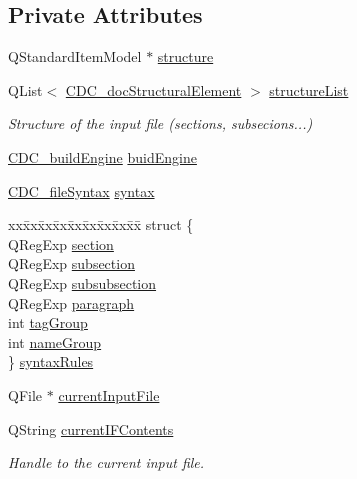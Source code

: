 \subsection*{Private Attributes}
\begin{DoxyCompactItemize}
\item 
Q\+Standard\+Item\+Model $\ast$ \hyperlink{classinput_file_parser_ac875012f371d91ecfc383e61f49ed0d4}{structure}
\item 
Q\+List$<$ \hyperlink{struct_c_d_c__doc_structural_element}{C\+D\+C\+\_\+doc\+Structural\+Element} $>$ \hyperlink{classinput_file_parser_a74bd2cbf0855006b5586da0b00c9420b}{structure\+List}
\begin{DoxyCompactList}\small\item\em Structure of the input file (sections, subsecions...) \end{DoxyCompactList}\item 
\hyperlink{cdcdefs_8h_abd38cc943467f0d66216a60454d5ee06}{C\+D\+C\+\_\+build\+Engine} \hyperlink{classinput_file_parser_aa4ec122a74489e07523207b7077a936b}{buid\+Engine}
\item 
\hyperlink{cdcdefs_8h_ab649dd84a9663b16384131638df4d313}{C\+D\+C\+\_\+file\+Syntax} \hyperlink{classinput_file_parser_a9528ecb148895886207571dcaa920626}{syntax}
\item 
\begin{tabbing}
xx\=xx\=xx\=xx\=xx\=xx\=xx\=xx\=xx\=\kill
struct \{\\
\>QRegExp \hyperlink{classinput_file_parser_a7ab3cafcf0f20989346e4d73cc18de88}{section}\\
\>QRegExp \hyperlink{classinput_file_parser_a70c6d19dc97306b9de996ae534198e96}{subsection}\\
\>QRegExp \hyperlink{classinput_file_parser_a3b119638757867ee5fd27f20cbbc56ec}{subsubsection}\\
\>QRegExp \hyperlink{classinput_file_parser_a2701509e686e9c80ff9ca419d4431dad}{paragraph}\\
\>int \hyperlink{classinput_file_parser_ab142598be7ed31c434e5230c3feed1c1}{tagGroup}\\
\>int \hyperlink{classinput_file_parser_a3f70a628f3cfbc541da8b90970f09db3}{nameGroup}\\
\} \hyperlink{classinput_file_parser_a47a7cdb8d77cae8fc1e81e86afb9ff31}{syntaxRules}\\

\end{tabbing}\item 
Q\+File $\ast$ \hyperlink{classinput_file_parser_a09bd8a795ff58263e9afa2ff1200c4cc}{current\+Input\+File}
\item 
Q\+String \hyperlink{classinput_file_parser_a112d1bd30d2093be8eb76ed02333a322}{current\+I\+F\+Contents}
\begin{DoxyCompactList}\small\item\em Handle to the current input file. \end{DoxyCompactList}\end{DoxyCompactItemize}



